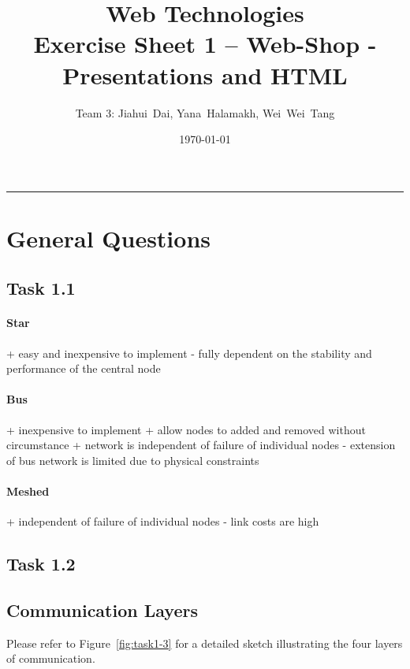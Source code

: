\documentclass[a4paper,12pt]{article} %
\title{Web Technologies \\
        \large{Exercise Sheet 1 -- Web-Shop - Presentations and HTML}} %
\author{Team 3: Jiahui~Dai, Yana~Halamakh, Wei~Wei~Tang} %
\date{\today} %
\begin{document}
\maketitle %
\hrule %
\tableofcontents %
\newpage



\section{General Questions}

\subsection{Task 1.1}

\paragraph{Star}
+   easy and inexpensive to implement 
-    fully dependent on the stability and performance of the central node

\paragraph{Bus}
+   inexpensive to implement
+   allow nodes to added and removed without circumstance
+   network is independent of failure of individual nodes
-    extension of bus network is limited due to physical constraints

\paragraph{Meshed}
+   independent of failure of individual nodes
-    link costs are high

\subsection{Task 1.2}


\subsection{Communication Layers}
Please refer to Figure~\ref{fig:task1-3} for a detailed sketch illustrating the four layers of communication.
\end{document}
